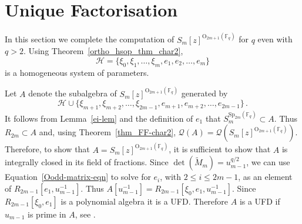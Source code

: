 \documentclass{amsart}
\newcommand{\field}{\mathbb{F}}
\newcommand{\syp}[2]{{{\text{Sp}_{{#1}}(\field_{#2})}}}
\newcommand{\orth}[2]{{{\text{O}_{{#1}}(\field_{#2})}}}
\newcommand{\HH}{\mathcal{H}}
\newcommand{\FF}{\mathcal{Q}}
\begin{document}
\section{Unique Factorisation}\label{sec: ufd}

In this section we complete the computation of $S_m[z]^{\orth{2m+1}{q}}$ for $q$ even with $q>2$.
Using Theorem~\ref{ortho_hsop_thm_char2}, 
    $$
        \HH=\{\xi_0,\xi_1,\ldots,\xi_{m},e_1,e_2,\ldots,e_{m}\}
    $$
is a homogeneous system of parameters.

Let $A$ denote the subalgebra of $S_m[z]^{\orth{2m+1}{q}}$ generated by 
    $$
        \HH\cup\{\xi_{m+1},\xi_{m+2},\ldots,\xi_{2m-1},e_{m+1},e_{m+2},\ldots,e_{2m-1}\}\, .
    $$
It follows from Lemma~\ref{ei-lem} and the definition of $e_1$ that $S_m^{\syp{2m}{q}}\subset A$.
Thus $R_{2m}\subset A$ and, using Theorem~\ref{thm_FF-char2}, $\FF(A)=\FF(S_m[z]^{\orth{2m+1}{q}})$.
Therefore, to show that $A=S_m[z]^{\orth{2m+1}{q}}$, it is sufficient to show that $A$ is integrally closed in its field of fractions.
Since $\det(\widetilde{M}_m)=u_{m-1}^{q/2}$, we can use Equation~\ref{Oodd-matrix-eqn} to solve for $e_i$, with $2\leq i\leq 2m-1$,
as an element of $R_{2m-1}[e_1,u_{m-1}^{-1}]$.
Thus $A[u_{m-1}^{-1}]=R_{2m-1}[\xi_0,e_1,u_{m-1}^{-1}]$.
Since $R_{2m-1}[\xi_0,e_1]$ is a polynomial algebra it is a UFD. Therefore $A$ is a UFD if $u_{m-1}$ is prime in $A$, see 
\cite[Theorem 20.2]{matsumura-commringtheo:86}.
\end{document}
